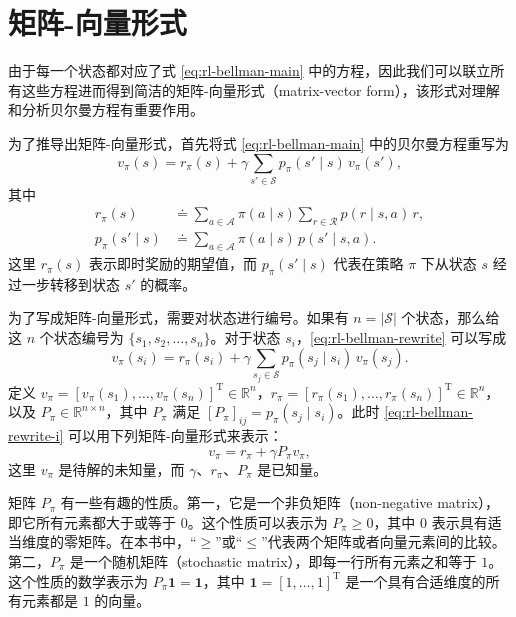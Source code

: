 \section{矩阵-向量形式}
\label{sec:rl-bellman-matrix}

由于每一个状态都对应了式 \cref{eq:rl-bellman-main} 中的方程，因此我们可以联立所有这些方程进而得到简洁的矩阵-向量形式（matrix-vector form），该形式对理解和分析贝尔曼方程有重要作用。

为了推导出矩阵-向量形式，首先将式 \cref{eq:rl-bellman-main} 中的贝尔曼方程重写为
\begin{equation}
v_\pi(s) = r_\pi(s) + \gamma \sum_{s' \in \mathcal{S}} p_\pi(s' \mid s) \, v_\pi(s'),
\label{eq:rl-bellman-rewrite}
\end{equation}
其中
\begin{equation*}
\begin{aligned}
r_\pi(s) &\doteq \sum_{a \in \mathcal{A}} \pi(a \mid s) \sum_{r \in \mathcal{R}} p(r \mid s, a) \, r, \\
p_\pi(s' \mid s) &\doteq \sum_{a \in \mathcal{A}} \pi(a \mid s) \, p(s' \mid s, a).
\end{aligned}
\end{equation*}
这里 $r_\pi(s)$ 表示即时奖励的期望值，而 $p_\pi(s' \mid s)$ 代表在策略 $\pi$ 下从状态 $s$ 经过一步转移到状态 $s'$ 的概率。

为了写成矩阵-向量形式，需要对状态进行编号。如果有 $n = |\mathcal{S}|$ 个状态，那么给这 $n$ 个状态编号为 $\{s_1, s_2, \ldots, s_n\}$。对于状态 $s_i$，\cref{eq:rl-bellman-rewrite} 可以写成
\begin{equation}
v_\pi(s_i) = r_\pi(s_i) + \gamma \sum_{s_j \in \mathcal{S}} p_\pi(s_j \mid s_i) \, v_\pi(s_j).
\label{eq:rl-bellman-rewrite-i}
\end{equation}
定义 $v_\pi = [v_\pi(s_1), \dots, v_\pi(s_n)]^{\mathrm{T}} \in \mathbb{R}^n$，$r_\pi = [r_\pi(s_1), \dots, r_\pi(s_n)]^{\mathrm{T}} \in \mathbb{R}^n$，以及 $P_\pi \in \mathbb{R}^{n \times n}$，其中 $P_\pi$ 满足 $[P_\pi]_{ij} = p_\pi(s_j \mid s_i)$。此时 \cref{eq:rl-bellman-rewrite-i} 可以用下列矩阵-向量形式来表示：
\begin{equation}
v_\pi = r_\pi + \gamma P_\pi v_\pi,
\label{eq:rl-bellman-mv}
\end{equation}
这里 $v_\pi$ 是待解的未知量，而 $\gamma$、$r_\pi$、$P_\pi$ 是已知量。

矩阵 $P_\pi$ 有一些有趣的性质。第一，它是一个非负矩阵（non-negative matrix），即它所有元素都大于或等于 $0$。这个性质可以表示为 $P_\pi \geqslant 0$，其中 $0$ 表示具有适当维度的零矩阵。在本书中，“$\geqslant$”或“$\leqslant$”代表两个矩阵或者向量元素间的比较。第二，$P_\pi$ 是一个随机矩阵（stochastic matrix），即每一行所有元素之和等于 $1$。这个性质的数学表示为 $P_\pi \mathbf{1} = \mathbf{1}$，其中 $\mathbf{1} = [1, \ldots, 1]^{\mathrm{T}}$ 是一个具有合适维度的所有元素都是 $1$ 的向量。

